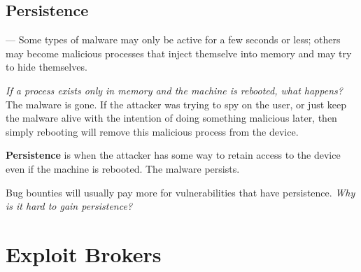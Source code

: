 \documentclass[11pt]{article}
\begin{document}
\subsection{Persistence} --- Some types of malware may only be active for a few seconds or less; others may become malicious processes that inject themselve into memory and may try to hide themselves.

{\it If a process exists only in memory and the machine is rebooted, what happens?} The malware is gone. If the attacker was trying to spy on the user, or just keep the malware alive with the intention of doing something malicious later, then simply rebooting will remove this malicious process from the device. 

{\bf Persistence} is when the attacker has some way to retain access to the device even if the machine is rebooted. The malware persists. 

Bug bounties will usually pay more for vulnerabilities that have persistence. {\it Why is it hard to gain persistence?}

\section{Exploit Brokers}

\section{}
\end{document}
